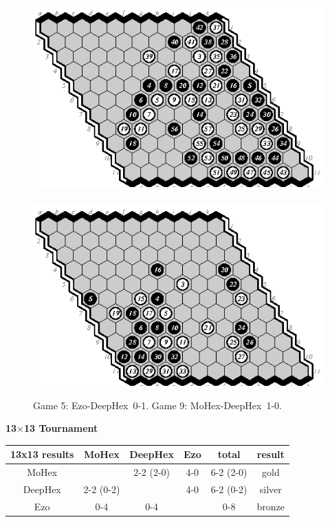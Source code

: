 \documentclass{icga}
\def\Dx{\mbox{\sc DeepHex}}
\def\Eo{\mbox{\sc Ezo}}
\def\Mx{\mbox{\sc MoHex}}
\begin{document}
\begin{figure}[hbp]
\includegraphics[scale=1.3]{5e-d.swap.eps}\hspace*{-1cm}\
\includegraphics[scale=1.3]{9m-d.eps}
\caption{Game 5: \Eo-\Dx\ 0-1. Game 9: \Mx-\Dx\ 1-0.}
\end{figure}

\newpage
{\large\bf 13$\times$13 Tournament}


\hfill\begin{tabular}{|c|c|c|c|c|c|}
\hline 13x13 results &\Mx{} &\Dx{}         & \Eo{}     & total & result \\ 
\hline \Mx{} &      &  2-2 (2-0)   &  4-0      & 6-2  (2-0) & gold \\
\hline \Dx{} &  2-2 (0-2) &         &  4-0      & 6-2 (0-2) &  silver\\
\hline \Eo{} &  0-4 &  0-4    &           & 0-8  &  bronze \\
\hline
\end{tabular}\hfill~
\end{document}
